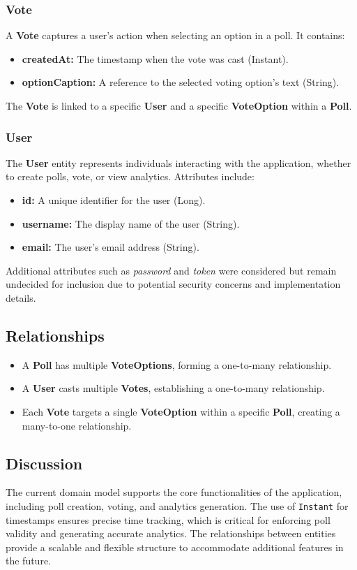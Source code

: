 \subsubsection{Vote}
A \textbf{Vote} captures a user's action when selecting an option in a poll. It contains:
\begin{itemize}
    \item \textbf{createdAt:} The timestamp when the vote was cast (Instant).
    \item \textbf{optionCaption:} A reference to the selected voting option's text (String).
\end{itemize}
The \textbf{Vote} is linked to a specific \textbf{User} and a specific \textbf{VoteOption} within a \textbf{Poll}.

\subsubsection{User}
The \textbf{User} entity represents individuals interacting with the application, whether to create polls, vote, or view analytics. Attributes include:
\begin{itemize}
    \item \textbf{id:} A unique identifier for the user (Long).
    \item \textbf{username:} The display name of the user (String).
    \item \textbf{email:} The user’s email address (String).
\end{itemize}
Additional attributes such as \textit{password} and \textit{token} were considered but remain undecided for inclusion due to potential security concerns and implementation details.

\subsection{Relationships}
\begin{itemize}
    \item A \textbf{Poll} has multiple \textbf{VoteOptions}, forming a one-to-many relationship.
    \item A \textbf{User} casts multiple \textbf{Votes}, establishing a one-to-many relationship.
    \item Each \textbf{Vote} targets a single \textbf{VoteOption} within a specific \textbf{Poll}, creating a many-to-one relationship.
\end{itemize}

\subsection{Discussion}
The current domain model supports the core functionalities of the application, including poll creation, voting, and analytics generation. The use of \texttt{Instant} for timestamps ensures precise time tracking, which is critical for enforcing poll validity and generating accurate analytics. The relationships between entities provide a scalable and flexible structure to accommodate additional features in the future.

